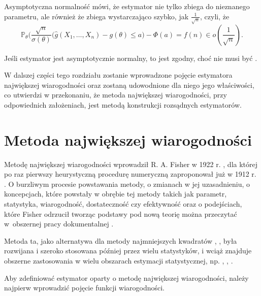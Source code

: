 Asymptotyczna normalność mówi, że estymator nie tylko zbiega do nieznanego parametru, ale również że zbiega wystarczająco szybko, jak $\frac{1}{\sqrt{n}}$, czyli, że 
$$\mathbb{P}_{\theta} \Big(\dfrac{\sqrt{n}}{\sigma(\theta)}(\hat{g}(X_1,\dots,X_n) -g(\theta) \leq a \Big) - \Phi(a) = f(n) \in o(\frac{1}{\sqrt{n}}) . $$ 

Jeśli estymator jest asymptotycznie normalny, to jest zgodny, choć nie musi
być \textit{}.

W dalszej części tego rozdziału zostanie wprowadzone pojęcie estymatora największej wiarogodności oraz zostaną udowodnione dla niego jego właściwości, co utwierdzi w przekonaniu, że metoda największej wiarogodności, przy odpowiednich założeniach, jest metodą konstrukcji rozsądnych estymatorów.

\newpage 

\section{Metoda największej wiarogodności}

Metodę największej wiarogodności wprowadził R. A. Fisher w 1922 r. \cite{fisher2}, dla której po raz pierwszy heurystyczną procedurę numeryczną zaproponował już w 1912 r. \cite{fisher1}. O burzliwym procesie powstawania metody, o zmianach w jej uzasadnieniu, o koncepcjach, które powstały w obrębie tej metody takich jak parametr, statystyka, wiarogodność, dostateczność czy efektywność oraz o podejściach, które Fisher odrzucił tworząc podstawy pod nową teorię można przeczytać w~obszernej pracy dokumentalnej \cite{aldrich1}. 

Metoda ta, jako alternatywa dla metody najmniejszych kwadratów \cite{legendre1}, \cite{gauss1}, była rozwijana i szeroko stosowana później przez wielu statystyków, i wciąż znajduje obszerne zastosowania w wielu obszarach estymacji statystycznej, np. \cite{hutch1}, \cite{kenward1}, \cite{millar1}.

Aby zdefiniować estymator oparty o metodę największej wiarogodności, należy najpierw wprowadzić pojęcie funkcji wiarogodności.


